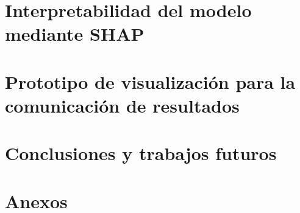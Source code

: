 \documentclass[11pt,twoside,openany]{thesis}
\begin{document}
\chapter{Interpretabilidad del modelo mediante SHAP}


\chapter{Prototipo de visualización para la comunicación de resultados}


\chapter{Conclusiones y trabajos futuros}

\chapter{Anexos}

\clearpage
\fancyhead[RE]{\bfseries\nouppercase{\leftmark}}
\fancyhead[LO]{\bfseries\nouppercase{\rightmark}}





\end{document}
